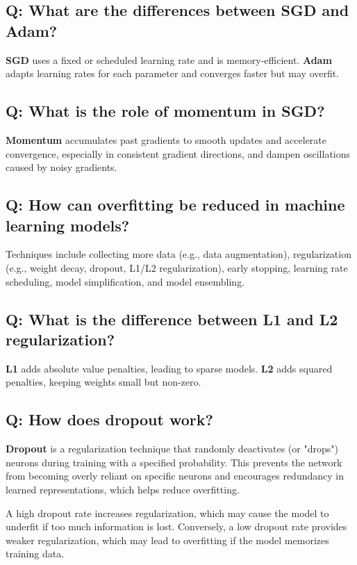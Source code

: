 \documentclass[11pt]{article}
\begin{document}
\subsection*{Q: What are the differences between SGD and Adam?}
\textbf{SGD} uses a fixed or scheduled learning rate and is memory-efficient. \textbf{Adam} adapts learning rates for each parameter and converges faster but may overfit.

\subsection*{Q: What is the role of momentum in SGD?}
\textbf{Momentum} accumulates past gradients to smooth updates and accelerate convergence, especially in consistent gradient directions, and dampen oscillations caused by noisy gradients.

\subsection*{Q: How can overfitting be reduced in machine learning models?}
Techniques include collecting more data (e.g., data augmentation), regularization (e.g., weight decay, dropout, L1/L2 regularization), early stopping, learning rate scheduling, model simplification, and model ensembling.

\subsection*{Q: What is the difference between L1 and L2 regularization?}
\textbf{L1} adds absolute value penalties, leading to sparse models. \textbf{L2} adds squared penalties, keeping weights small but non-zero.

\subsection*{Q: How does dropout work?}
\textbf{Dropout} is a regularization technique that randomly deactivates (or "drops") neurons during training with a specified probability. This prevents the network from becoming overly reliant on specific neurons and encourages redundancy in learned representations, which helps reduce overfitting.

A high dropout rate increases regularization, which may cause the model to underfit if too much information is lost. Conversely, a low dropout rate provides weaker regularization, which may lead to overfitting if the model memorizes training data.
\end{document}
